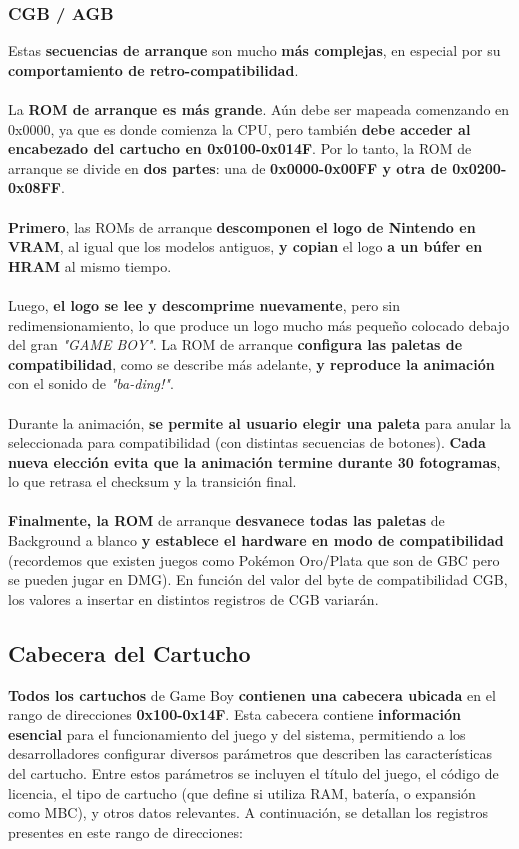 \subsubsection{CGB / AGB}
Estas \textbf{secuencias de arranque} son mucho \textbf{más complejas}, en especial por su \textbf{comportamiento de retro-compatibilidad}.
\\\\
La \textbf{ROM de arranque es más grande}. Aún debe ser mapeada comenzando en 0x0000, ya que es donde comienza la CPU, pero también \textbf{debe acceder al encabezado del cartucho en 0x0100-0x014F}. Por lo tanto, la ROM de arranque se divide en \textbf{dos partes}: una de \textbf{0x0000-0x00FF y otra de 0x0200-0x08FF}.
\\\\
\textbf{Primero}, las ROMs de arranque \textbf{descomponen el logo de Nintendo en VRAM}, al igual que los modelos antiguos, \textbf{y copian} el logo \textbf{a un búfer en HRAM} al mismo tiempo.
\\\\
Luego, \textbf{el logo se lee y descomprime nuevamente}, pero sin redimensionamiento, lo que produce un logo mucho más pequeño colocado debajo del gran \textit{"GAME BOY"}. La ROM de arranque \textbf{configura las paletas de compatibilidad}, como se describe más adelante, \textbf{y reproduce la animación} con el sonido de \textit{"ba-ding!"}.
\\\\
Durante la animación, \textbf{se permite al usuario elegir una paleta} para anular la seleccionada para compatibilidad (con distintas secuencias de botones). \textbf{Cada nueva elección evita que la animación termine durante 30 fotogramas}, lo que retrasa el checksum y la transición final.
\\\\
\textbf{Finalmente, la ROM} de arranque \textbf{desvanece todas las paletas} de Background a blanco \textbf{y establece el hardware en modo de compatibilidad} (recordemos que existen juegos como Pokémon Oro/Plata que son de GBC pero se pueden jugar en DMG). En función del valor del byte de compatibilidad CGB, los valores a insertar en distintos registros de CGB variarán.

\subsection{Cabecera del Cartucho}

\textbf{Todos los cartuchos} de Game Boy \textbf{contienen una cabecera ubicada} en el rango de direcciones \textbf{0x100-0x14F}. Esta cabecera contiene \textbf{información esencial} para el funcionamiento del juego y del sistema, permitiendo a los desarrolladores configurar diversos parámetros que describen las características del cartucho. Entre estos parámetros se incluyen el título del juego, el código de licencia, el tipo de cartucho (que define si utiliza RAM, batería, o expansión como MBC), y otros datos relevantes. A continuación, se detallan los registros presentes en este rango de direcciones:

